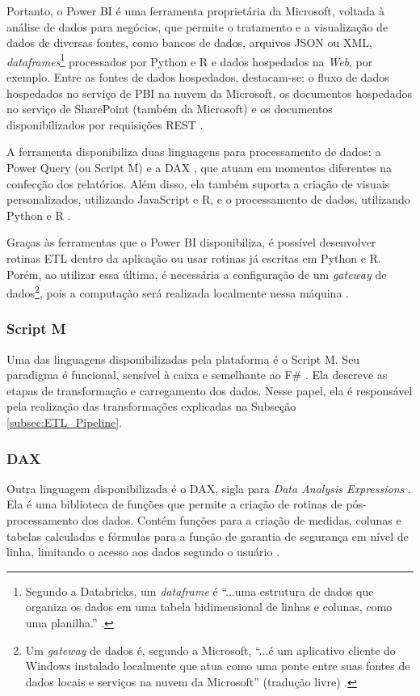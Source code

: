 Portanto, o Power BI é uma ferramenta proprietária da Microsoft, voltada à análise de dados para negócios, que permite o tratamento e a visualização de dados de diversas fontes, como bancos de dados, arquivos JSON ou XML, \textit{dataframes}\footnote{Segundo a Databricks, um \textit{dataframe} é ``...uma estrutura de dados que organiza os dados em uma tabela bidimensional de linhas e colunas, como uma planilha.'' \cite{Dataframe_Definition}.} processados por Python e R e dados hospedados na \textit{Web}, por exemplo. Entre as fontes de dados hospedados, destacam-se: o fluxo de dados hospedados no serviço de PBI na nuvem da Microsoft, os documentos hospedados no serviço de SharePoint (também da Microsoft) e os documentos disponibilizados por requisições REST  \cite{PBI_Fontes_Dados}.


A ferramenta disponibiliza duas linguagens para processamento de dados: a Power Query (ou Script M) \cite{PBI_M_Referencia} e a DAX \cite{PBI_DAX_Referencia}, que atuam em momentos diferentes na confecção dos relatórios. Além disso, ela também suporta a criação de visuais personalizados, utilizando JavaScript e R, e o processamento de dados, utilizando Python e R  \cite{PBI_Visuais_Customizados}.


Graças às ferramentas que o Power BI disponibiliza, é possível desenvolver rotinas ETL dentro da aplicação ou usar rotinas já escritas em Python e R. Porém, ao utilizar essa última, é necessária a configuração de um \textit{gateway} de dados\footnote{Um \textit{gateway} de dados é, segundo a Microsoft, ``...é um aplicativo cliente do Windows instalado localmente que atua como uma ponte entre suas fontes de dados locais e serviços na nuvem da Microsoft'' (tradução livre) \cite{Data_Gateway_Def}.}, pois a computação será realizada localmente nessa máquina \cite{PBI_Gateway_Python_R}.



\subsubsection{Script M}


Uma das linguagens disponibilizadas pela plataforma é o Script M. Seu paradigma é funcional, sensível à caixa e semelhante ao F\# \cite{PBI_M_Referencia}. Ela descreve as etapas de transformação e carregamento dos dados. Nesse papel, ela é responsável pela realização das transformações explicadas na Subseção \ref{subsec:ETL_Pipeline}. 


\subsubsection{DAX}
Outra linguagem disponibilizada é o DAX, sigla para \textit{Data Analysis Expressions} \cite{PBI_DAX_Referencia}. Ela é uma biblioteca de funções que permite a criação de rotinas de pós-processamento dos dados. Contém funções para a criação de medidas, colunas e tabelas calculadas e fórmulas para a função de garantia de segurança em nível de linha, limitando o acesso aos dados segundo o usuário \cite{PBI_DAX_Overview} \cite{PBI_RLS}.